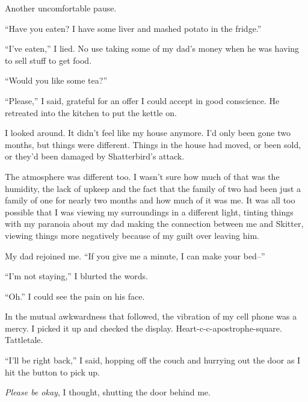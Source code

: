 Another uncomfortable pause.



``Have you eaten?  I have some liver and mashed potato in the fridge.''



``I've eaten,'' I lied.  No use taking some of my dad's money when he was having to sell stuff to get food.



``Would you like some tea?''



``Please,'' I said, grateful for an offer I could accept in good conscience.  He retreated into the kitchen to put the kettle on.



I looked around.  It didn't feel like my house anymore.  I'd only been gone two months, but things were different.  Things in the house had moved, or been sold, or they'd been damaged by Shatterbird's attack.



The atmosphere was different too.  I wasn't sure how much of that was the humidity, the lack of upkeep and the fact that the family of two had been just a family of one for nearly two months and how much of it was me.  It was all too possible that I was viewing my surroundings in a different light, tinting things with my paranoia about my dad making the connection between me and Skitter, viewing things more negatively because of my guilt over leaving him.



My dad rejoined me.  ``If you give me a minute, I can make your bed--''



``I'm not staying,'' I blurted the words.



``Oh.''  I could see the pain on his face.



In the mutual awkwardness that followed, the vibration of my cell phone was a mercy.  I picked it up and checked the display.  Heart-c-c-apostrophe-square.  Tattletale.



``I'll be right back,'' I said, hopping off the couch and hurrying out the door as I hit the button to pick up.



\emph{Please be okay}, I thought, shutting the door behind me.



